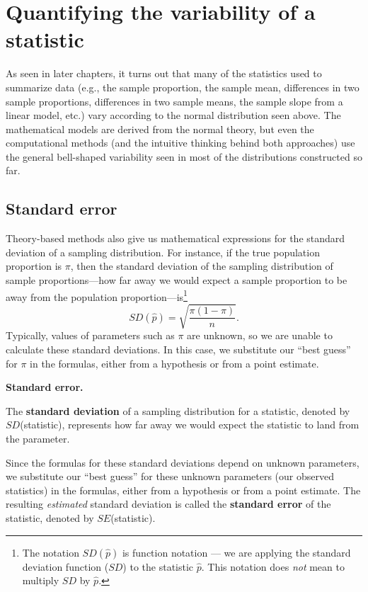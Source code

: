 \documentclass[
  10pt,
  openany]{book}
\theoremstyle{definition}
\theoremstyle{definition}
\theoremstyle{definition}
\theoremstyle{definition}
\theoremstyle{remark}
\begin{document}
\section{Quantifying the variability of a statistic}\label{quantifying-the-variability-of-a-statistic}

As seen in later chapters, it turns out that many of the statistics used to summarize data (e.g., the sample proportion, the sample mean, differences in two sample proportions, differences in two sample means, the sample slope from a linear model, etc.) vary according to the normal distribution seen above.
The mathematical models are derived from the normal theory, but even the computational methods (and the intuitive thinking behind both approaches) use the general bell-shaped variability seen in most of the distributions constructed so far.

\subsection{Standard error}\label{standard-error}

Theory-based methods also give us mathematical expressions for the standard deviation of a sampling distribution. For instance, if the true population proportion is \(\pi\), then the standard deviation of the sampling distribution of sample proportions---how far away we would expect a sample proportion to be away from the population proportion---is\footnote{The notation \(SD(\hat{p})\) is function notation --- we are applying the standard deviation function (\(SD\)) to the statistic \(\hat{p}\). This notation does \emph{not} mean to multiply \(SD\) by \(\hat{p}\).}
\[
SD(\hat{p}) = \sqrt{\frac{\pi(1-\pi)}{n}}.
\]
Typically, values of parameters such as \(\pi\) are unknown, so we are unable to calculate these standard deviations. In this case, we substitute our ``best guess'' for \(\pi\) in the formulas, either from a hypothesis or from a point estimate.

\textbf{Standard error.}

The \textbf{standard deviation} of a sampling distribution for a statistic, denoted by \(SD\)(statistic), represents how far away we would expect the statistic to land from the parameter.

Since the formulas for these standard deviations depend on unknown parameters, we substitute our ``best guess'' for these unknown parameters (our observed statistics) in the formulas, either from a hypothesis or from a point estimate. The resulting \emph{estimated} standard deviation is called the \textbf{standard error} of the statistic, denoted by \(SE\)(statistic).
\end{document}

